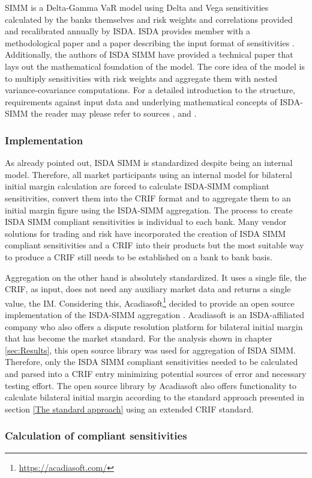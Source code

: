 \documentclass[../Thesis_AHoecherl.tex]{subfiles}
\begin{document}
    SIMM is a Delta-Gamma VaR model using Delta and Vega sensitivities calculated by the banks themselves and risk weights and correlations provided and recalibrated annually by ISDA. ISDA provides member with a methodological paper \cite{SIMM} and a paper describing the input format of sensitivities \cite{RiskDataStandard}.
    Additionally, the authors of ISDA SIMM have provided a technical paper \cite{SIMM_technical_paper} that lays out the mathematical foundation of the model. 
    The core idea of the model is to multiply sensitivities with risk weights and aggregate them with nested variance-covariance computations. For a detailed introduction to the structure, requirements against input data and underlying mathematical concepts of ISDA-SIMM the reader may please refer to sources \cite{SIMM}, \cite{RiskDataStandard} and \cite{SIMM_technical_paper}.

    \subsubsection{Implementation}\label{sec:ISDA SIMM implementation}
    As already pointed out, \gls{ISDA SIMM} is standardized despite being an internal model. Therefore, all market participants using an internal model for bilateral initial margin calculation are forced to calculate ISDA-SIMM compliant sensitivities, convert them into the \gls{CRIF} format and to aggregate them to an initial margin figure using the ISDA-SIMM aggregation.
    The process to create \gls{ISDA SIMM} compliant sensitivities is individual to each bank. Many vendor solutions for trading and risk have incorporated the creation of \gls{ISDA SIMM} compliant sensitivities and a \gls{CRIF} into their products but the most suitable way to produce a \gls{CRIF} still needs to be established on a bank to bank basis.
    
    Aggregation on the other hand is absolutely standardized. It uses a single file, the \gls{CRIF}, as input, does not need any auxiliary market data and returns a single value, the IM. 
    Considering this, Acadiasoft\footnote{\url{https://acadiasoft.com/}} decided to provide an open source implementation of the ISDA-SIMM aggregation \cite{simm-lib}. Acadiasoft is an ISDA-affiliated company who also offers a dispute resolution platform for bilateral initial margin that has become the market standard.
    For the analysis shown in chapter \ref{sec:Results}, this open source library was used for aggregation of \gls{ISDA SIMM}. 
    Therefore, only the ISDA SIMM compliant sensitivities needed to be calculated and parsed into a \gls{CRIF} entry minimizing potential sources of error and necessary testing effort. The open source library by Acadiasoft also offers functionality to calculate bilateral initial margin according to the standard approach presented in section \ref{The standard approach} using an extended \gls{CRIF} standard.

    \subsubsection{Calculation of compliant sensitivities}\label{Calculation of ISDA SIMM compliant sensitivities}
\end{document}
